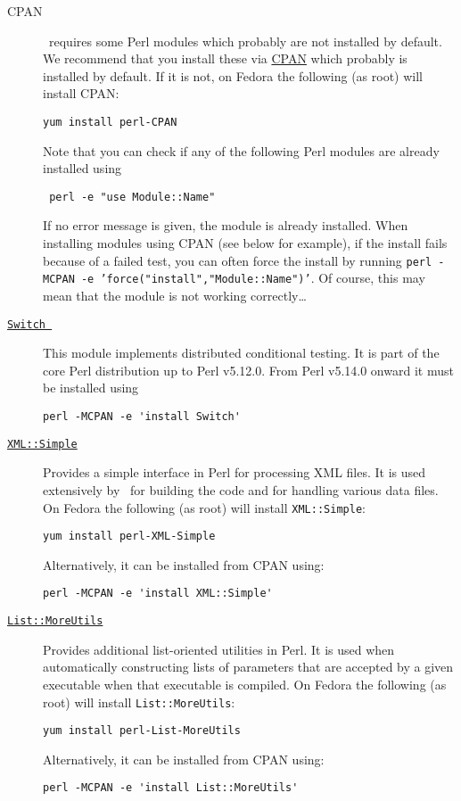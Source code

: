 \begin{description}
\item [CPAN] \glc\ requires some Perl modules which probably are not installed by default. We recommend that you install these via \href{http://www.cpan.org/}{CPAN} which probably is installed by default. If it is not, on Fedora the following (as root) will install CPAN:
\begin{verbatim}
yum install perl-CPAN
\end{verbatim}
Note that you can check if any of the following Perl modules are already installed using
\begin{verbatim}
 perl -e "use Module::Name"
\end{verbatim}
If no error message is given, the module is already installed. When installing modules using CPAN (see below for example), if the install fails because of a failed test, you can often force the install by running {\tt perl -MCPAN -e 'force("install","Module::Name")'}. Of course, this may mean that the module is not working correctly\ldots

\item [\href{http://search.cpan.org/~rgarcia/Switch-2.16/Switch.pm}{{\tt Switch }}] This module implements distributed conditional testing. It is part of the core Perl distribution up to Perl v5.12.0. From Perl v5.14.0 onward it must be installed using
\begin{verbatim}
perl -MCPAN -e 'install Switch'
\end{verbatim}

\item [\href{http://search.cpan.org/~grantm/XML-Simple-2.18/lib/XML/Simple.pm}{{\tt XML::Simple}}] Provides a simple interface in Perl for processing XML files. It is used extensively by \glc\ for building the code and for handling various data files. On Fedora the following (as root) will install {\tt XML::Simple}:
\begin{verbatim}
yum install perl-XML-Simple
\end{verbatim}
Alternatively, it can be installed from CPAN using:
\begin{verbatim}
perl -MCPAN -e 'install XML::Simple'
\end{verbatim}

\item [\href{http://search.cpan.org/~adamk/List-MoreUtils-0.33/lib/List/MoreUtils.pm}{{\tt List::MoreUtils}}] Provides additional list-oriented utilities in Perl. It is used when automatically constructing lists of parameters that are accepted by a given executable when that executable is compiled. On Fedora the following (as root) will install {\tt List::MoreUtils}:
\begin{verbatim}
yum install perl-List-MoreUtils
\end{verbatim}
Alternatively, it can be installed from CPAN using:
\begin{verbatim}
perl -MCPAN -e 'install List::MoreUtils'
\end{verbatim}


\end{description}

